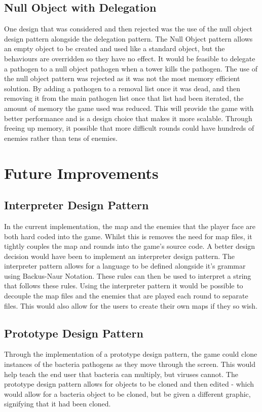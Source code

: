 \documentclass[a4paper,12pt]{article}
\begin{document}
\subsection*{Null Object with Delegation}
One design that was considered and then rejected was the use of the null object design pattern alongside the delegation pattern. The Null Object pattern allows an empty object to be created and used like a standard object, but the behaviours are overridden so they have no effect. It would be feasible to delegate a pathogen to a null object pathogen when a tower kills the pathogen. The use of the null object pattern was rejected as it was not the most memory efficient solution. By adding a pathogen to a removal list once it was dead, and then removing it from the main pathogen list once that list had been iterated, the amount of memory the game used was reduced. This will provide the game with better performance and is a design choice that makes it more scalable. Through freeing up memory, it possible that more difficult rounds could have hundreds of enemies rather than tens of enemies. 

\section*{Future Improvements}
\subsection*{Interpreter Design Pattern}
In the current implementation, the map and the enemies that the player face are both hard coded into the game. Whilst this is removes the need for map files, it tightly couples the map and rounds into the game's source code. A better design decision would have been to implement an interpreter design pattern. The interpreter pattern allows for a language to be defined alongside it's grammar using Backus-Naur Notation\cite{GoF-Book}. These rules can then be used to interpret a string that follows these rules. Using the interpreter pattern it would be possible to decouple the map files and the enemies that are played each round to separate files. This would also allow for the users to create their own maps if they so wish. 

\subsection*{Prototype Design Pattern}
Through the implementation of a prototype design pattern, the game could clone instances of the bacteria pathogens as they move through the screen. This would help teach the end user that bacteria can multiply, but viruses cannot. The prototype design pattern allows for objects to be cloned and then edited\cite{GoF-Book} - which would allow for a bacteria object to be cloned, but be given a different graphic, signifying that it had been cloned. 
\end{document}
